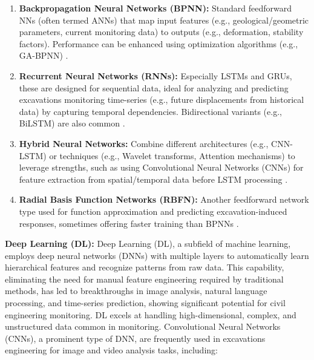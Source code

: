 \documentclass[preprint,11pt,authoryear,3p]{elsarticle}
\begin{document}
\begin{enumerate}
    \item \textbf{Backpropagation Neural Networks (BPNN):} Standard feedforward NNs (often termed ANNs) that map input features (e.g., geological/geometric parameters, current monitoring data) to outputs (e.g., deformation, stability factors). Performance can be enhanced using optimization algorithms (e.g., GA-BPNN) \citep{LU2023139241}.

    \item \textbf{Recurrent Neural Networks (RNNs):} Especially LSTMs and GRUs, these are designed for sequential data, ideal for analyzing and predicting excavations monitoring time-series (e.g., future displacements from historical data) by capturing temporal dependencies. Bidirectional variants (e.g., BiLSTM) are also common \citep{LI2023105243}.

    \item \textbf{Hybrid Neural Networks:} Combine different architectures (e.g., CNN-LSTM) or techniques (e.g., Wavelet transforms, Attention mechanisms) to leverage strengths, such as using Convolutional Neural Networks (CNNs) for feature extraction from spatial/temporal data before LSTM processing \citep{zhao2025early}.

    \item \textbf{Radial Basis Function Networks (RBFN):} Another feedforward network type used for function approximation and predicting excavation-induced responses, sometimes offering faster training than BPNNs \citep{zhou_performance_2021}.
\end{enumerate}

\textbf{Deep Learning (DL):} Deep Learning (DL), a subfield of machine learning, employs deep neural networks (DNNs) with multiple layers to automatically learn hierarchical features and recognize patterns from raw data. This capability, eliminating the need for manual feature engineering required by traditional methods, has led to breakthroughs in image analysis, natural language processing, and time-series prediction, showing significant potential for civil engineering monitoring. DL excels at handling high-dimensional, complex, and unstructured data common in monitoring. Convolutional Neural Networks (CNNs), a prominent type of DNN, are frequently used in excavations engineering for image and video analysis tasks, including:
\end{document}
